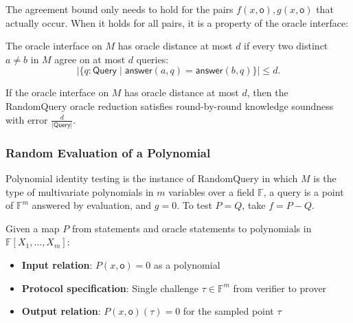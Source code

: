 The agreement bound only needs to hold for the pairs $f(x, \mathsf{o}), g(x, \mathsf{o})$ that actually occur. When it holds for all pairs, it is a property of the oracle interface:

\begin{definition}
    \label{def:oracle_distance}
    The oracle interface on $M$ has oracle distance at most $d$ if every two distinct $a \neq b$ in $M$ agree on at most $d$ queries:
    \[ |\{q : \mathsf{Query} \mid \mathsf{answer}(a, q) = \mathsf{answer}(b, q)\}| \leq d. \]
    \leanok
\end{definition}

\begin{theorem}
    If the oracle interface on $M$ has oracle distance at most $d$, then the RandomQuery oracle reduction satisfies round-by-round knowledge soundness with error $\frac{d}{|\mathsf{Query}|}$.
    \leanok
\end{theorem}

\subsubsection{Random Evaluation of a Polynomial}

Polynomial identity testing is the instance of RandomQuery in which $M$ is the type of multivariate polynomials in $m$ variables over a field $\mathbb{F}$, a query is a point of $\mathbb{F}^m$ answered by evaluation, and $g = 0$. To test $P = Q$, take $f = P - Q$.

\begin{definition}
    \label{def:random_evaluation}
    Given a map $P$ from statements and oracle statements to polynomials in $\mathbb{F}[X_1, \ldots, X_m]$:
    \begin{itemize}
        \item \textbf{Input relation}: $P(x, \mathsf{o}) = 0$ as a polynomial
        \item \textbf{Protocol specification}: Single challenge $\tau \in \mathbb{F}^m$ from verifier to prover
        \item \textbf{Output relation}: $P(x, \mathsf{o})(\tau) = 0$ for the sampled point $\tau$
    \end{itemize}
    \leanok
\end{definition}

